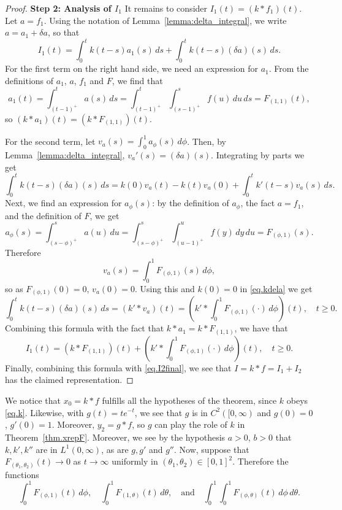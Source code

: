 \documentclass[10pt,reqno]{amsart}
\theoremstyle{definition}
\begin{document}
\begin{proof}
		\textbf{Step 2: Analysis of $I_1$}
		It remains to consider $I_1(t) = (k * f_1)(t)$. Let $a = f_1$. Using the notation of Lemma~\ref{lemma:delta_integral}, we write $a = a_1 + \delta a$, so that 
		\[
		I_1(t)=\int_0^t k(t-s)a_1(s)\,ds + \int_0^t k(t-s)(\delta a)(s)\,ds. 
		\]
		For the first term on the right hand side, we need an expression for $a_1$. From the definitions of $a_1$, $a$, $f_1$ and $F$, we find that  
		\[
		a_1(t) = \int_{(t-1)^+}^t a(s) \, ds = \int_{(t-1)^+}^t \int_{(s-1)^+}^s f(u) \, du \, ds = F_{(1,1)}(t),
		\]
		so $(k\ast a_1)(t) = (k\ast F_{(1,1)})(t)$. 
		
		For the second term, let $v_a(s) = \int_0^1 a_\phi(s)\,d\phi$. Then, by Lemma~\ref{lemma:delta_integral}, $v_a'(s)=(\delta a)(s)$. Integrating by parts we get 
		\begin{equation} \label{eq.kdela}
			\int_0^t k(t-s)(\delta a)(s)\,ds = k(0)v_a(t)-k(t)v_a(0)+\int_0^t k'(t-s)v_a(s)\,ds.
		\end{equation}
		Next, we find an expression for $a_\phi(s)$: by the definition of $a_\phi$, the fact $a=f_1$, and the definition of $F$, we get 
		\[ 
		a_\phi(s) = \int_{(s-\phi)^+}^s a(u) \, du = \int_{(s-\phi)^+}^s \int_{(u-1)^+}^u f(y) \, dy \, du = F_{(\phi, 1)}(s). \]
		Therefore 
		\[
		v_a(s)=\int_0^1 F_{(\phi, 1)}(s)\,d\phi,
		\]
		so as $F_{(\phi,1)}(0)=0$, $v_a(0)=0$. Using this and $k(0)=0$ in \eqref{eq.kdela} we get 
		\[
		\int_0^t k(t-s)(\delta a)(s)\,ds = (k'\ast v_a)(t) = \left(k'\ast \int_0^1 F_{(\phi, 1)}(\cdot)\,d\phi\right)(t), \quad t\geq 0.	
		\]
		Combining this formula with the fact that $k\ast a_1 = k\ast F_{(1,1)}$, we have that 
		\[
		I_1(t)= (k\ast F_{(1,1)})(t)+\left(k'\ast \int_0^1 F_{(\phi, 1)}(\cdot)\,d\phi\right)(t), \quad t\geq 0.
		\]
		Finally, combining this formula with \eqref{eq.I2final}, we see that $I=k\ast f=I_1+I_2$ has the claimed representation. 
	\end{proof} 
	We notice that $x_0=k\ast f$ fulfills all the hypotheses of the theorem, since $k$ obeys \eqref{eq.k}. Likewise, with $g(t)=te^{-t}$, we see that $g$ is in $C^2([0,\infty)$ and $g(0)=0$, $g'(0)=1$. Moreover, $y_2=g\ast f$, so $g$ can play the role of $k$ in Theorem~\ref{thm.xrepF}. Moreover, we see by the hypothesis $a>0$, $b>0$ that $k,k', k''$ are in $L^1(0,\infty)$, as are $g, g'$ and $g''$. Now, suppose that 
	$F_{(\theta_1,\theta_2)}(t)\to 0$ as $t\to\infty$ uniformly in $(\theta_1,\theta_2)\in [0,1]^2$. Therefore the functions 
	\[
	\int_0^1 F_{(\phi,1)}(t)\,d\phi, \quad \int_0^1 F_{(1,\theta)}(t)\,d\theta, \quad \text{and} \quad  \int_0^1	\int_0^1 F_{(\phi,\theta)}(t)\,d\phi \,d\theta. 
	\] 
\end{document}
